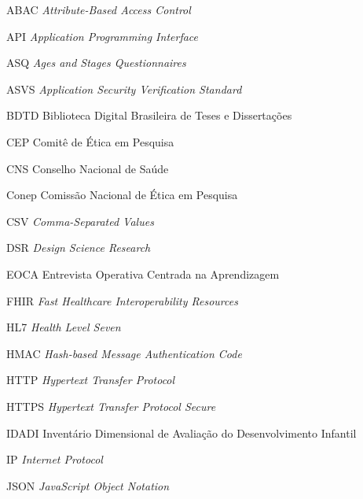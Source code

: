 \begin{siglas}
  \item[ABAC] \textit{Attribute-Based Access Control}

  \item[API] \textit{Application Programming Interface}

  \item[ASQ] \textit{Ages and Stages Questionnaires}

  \item[ASVS] \textit{Application Security Verification Standard}

  \item[BDTD] Biblioteca Digital Brasileira de Teses e Dissertações

  \item[CEP] Comitê de Ética em Pesquisa

  \item[CNS] Conselho Nacional de Saúde

  \item[Conep] Comissão Nacional de Ética em Pesquisa

  \item[CSV] \textit{Comma-Separated Values}

  \item[DSR] \textit{Design Science Research}

  \item[EOCA] Entrevista Operativa Centrada na Aprendizagem

  \item[FHIR] \textit{Fast Healthcare Interoperability Resources}

  \item[HL7] \textit{Health Level Seven}

  \item[HMAC] \textit{Hash-based Message Authentication Code}

  \item[HTTP] \textit{Hypertext Transfer Protocol}

  \item[HTTPS] \textit{Hypertext Transfer Protocol Secure}

  \item[IDADI] Inventário Dimensional de Avaliação do Desenvolvimento Infantil

  \item[IP] \textit{Internet Protocol}

  \item[JSON] \textit{JavaScript Object Notation}


\end{siglas}
